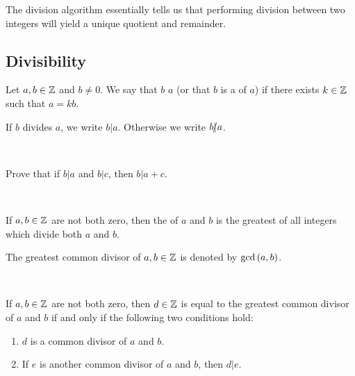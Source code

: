 \documentclass[11pt,fleqn,dvipsnames,usenames]{article}
\newcommand{\p}{\noindent}
\begin{document}
\p The division algorithm essentially tells us that performing division between two integers will yield a unique quotient and remainder.
\vsp

\subsection{Divisibility}

\begin{definition*} Let $a,b\in\mathbb{Z}$ and $b\neq 0$.  We say that $b$  $a$ (or that $b$ is a  of $a$) if there exists $k\in\mathbb{Z}$ such that $a = kb$.
\end{definition*}
\vsp

\notation If $b$ divides $a$, we write $b | a$.  Otherwise we write $b|\kern-0.9ex{/} a$.
\vsp

\begin{examples*}~
\vspace{2cm}

\end{examples*}
\newpage

\begin{example*}
Prove that if $b|a$ and $b|c$, then $b|a+c$.
\end{example*}
%
\begin{solution}~
\vspace{3cm}

\end{solution}
%
\begin{definition*} If $a,b\in\mathbb{Z}$ are not both zero, then the  of $a$ and $b$ is the greatest \nolinebreak of all integers which divide both $a$ and $b$.
\end{definition*}
\vsmsp

\notation The greatest common divisor of $a,b\in\mathbb{Z}$ is denoted by $\text{gcd}\left(a,b\right)$.
\vsp

\begin{example*}~
\vspace{1cm}

\end{example*}

%
\remark If $a,b\in\mathbb{Z}$ are not both zero, then $d\in\mathbb{Z}$ is equal to the greatest common divisor of $a$ and $b$ if and only if the following two conditions hold:
\begin{enumerate}[(1)]
\item $d$ is a common divisor of $a$ and $b$.
\item If $e$ is another common divisor of $a$ and $b$, then $d|e$.
\end{enumerate}
\vsmsp
\end{document}
